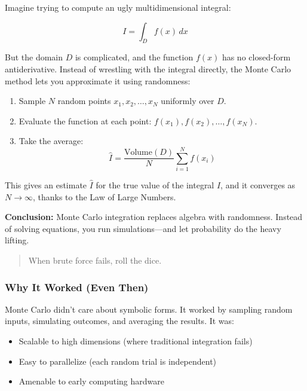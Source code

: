 \begin{example}[title={Monte Carlo: Estimating Integrals by Playing with Chance}]
Imagine trying to compute an ugly multidimensional integral:

\[
I = \int_D f(x)\, dx
\]

But the domain \( D \) is complicated, and the function \( f(x) \) has no closed-form antiderivative. Instead of wrestling with the integral directly, the Monte Carlo method lets you approximate it using randomness:

\begin{enumerate}
  \item Sample \( N \) random points \( x_1, x_2, \ldots, x_N \) uniformly over \( D \).
  \item Evaluate the function at each point: \( f(x_1), f(x_2), \ldots, f(x_N) \).
  \item Take the average:
  \[
  \hat{I} = \frac{\text{Volume}(D)}{N} \sum_{i=1}^N f(x_i)
  \]
\end{enumerate}

This gives an estimate \( \hat{I} \) for the true value of the integral \( I \), and it converges as \( N \to \infty \), thanks to the Law of Large Numbers.

\medskip

\noindent\textbf{Conclusion:} Monte Carlo integration replaces algebra with randomness. Instead of solving equations, you run simulations—and let probability do the heavy lifting.

\begin{quote}
When brute force fails, roll the dice.
\end{quote}
\end{example}


\subsubsection{Why It Worked (Even Then)}

Monte Carlo didn’t care about symbolic forms. It worked by sampling random inputs, simulating outcomes, and averaging the results. It was:

\begin{itemize}
  \item Scalable to high dimensions (where traditional integration fails)
  \item Easy to parallelize (each random trial is independent)
  \item Amenable to early computing hardware
\end{itemize}

